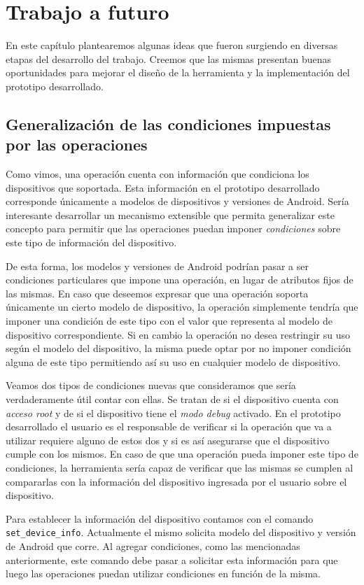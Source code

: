 \chapter{Trabajo a futuro} \label{chap:TrabajoFuturo}
En este capítulo plantearemos algunas ideas que fueron surgiendo en diversas etapas del desarrollo del trabajo. Creemos que las mismas presentan buenas oportunidades para mejorar el diseño de la herramienta y la implementación del prototipo desarrollado.

\section{Generalización de las condiciones impuestas por las operaciones}
Como vimos, una operación cuenta con información que condiciona los dispositivos que soportada. Esta información en el prototipo desarrollado corresponde únicamente a modelos de dispositivos y versiones de Android. Sería interesante desarrollar un mecanismo extensible que permita generalizar este concepto para permitir que las operaciones puedan imponer \emph{condiciones} sobre este tipo de información del dispositivo. 

De esta forma, los modelos y versiones de Android podrían pasar a ser condiciones particulares que impone una operación, en lugar de atributos fijos de las mismas. En caso que deseemos expresar que una operación soporta únicamente un cierto modelo de dispositivo, la operación simplemente tendría que imponer una condición de este tipo con el valor que representa al modelo de dispositivo correspondiente. Si en cambio la operación no desea restringir su uso según el modelo del dispositivo, la misma puede optar por no imponer condición alguna de este tipo permitiendo así su uso en cualquier modelo de dispositivo.

Veamos dos tipos de condiciones nuevas que consideramos que sería verdaderamente útil contar con ellas. Se tratan de si el dispositivo cuenta con \emph{acceso root} y de si el dispositivo tiene el \emph{modo debug} activado. En el prototipo desarrollado el usuario es el responsable de verificar si la operación que va a utilizar requiere alguno de estos dos y si es así asegurarse que el dispositivo cumple con los mismos. En caso de que una operación pueda imponer este tipo de condiciones, la herramienta sería capaz de verificar que las mismas se cumplen al compararlas con la información del dispositivo ingresada por el usuario sobre el dispositivo.

Para establecer la información del dispositivo contamos con el comando \texttt{set\_device\_info}. Actualmente el mismo solicita modelo del dispositivo y versión de Android que corre. Al agregar condiciones, como las mencionadas anteriormente, este comando debe pasar a solicitar esta información para que luego las operaciones puedan utilizar condiciones en función de la misma.

